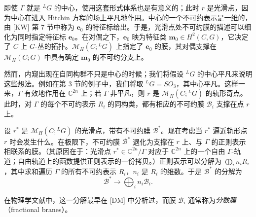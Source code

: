 \documentclass[11pt,a4paper]{article}
\newcommand{\Bun}{\mathrm{Bun}}
\begin{document}
即使 $\Gamma$ 就是 ${}^{L}G$ 的中心，使用这套形式体系也是有意义的；此时 $r$ 是光滑点，因为中心在进入 Hitchin 方程的场上平凡地作用。中心的一个不可约表示是一维的，由 [KW] 第 7 节中称为 $\boldsymbol{e}_0$ 的特征标给出。于是，光滑点处不可约膜的描述可以细化为同时指定特征标 $\boldsymbol{e}_0$。在对偶之下，$\boldsymbol{e}_0$ 映为特征类 $\boldsymbol{m}_0\in H^2(C,G)$，它决定了 $C$ 上 $G$-丛的拓扑。$\mathcal{M}_H(C;{}^{L}G)$ 上指定了 $\boldsymbol{e}_0$ 的膜，其对偶支撑在 $\mathcal{M}_H(C;G)$ 中具有确定 $\boldsymbol{m}_0$ 的不可约分支上。

然而，内窥出现在自同构群不只是中心的时候；我们将假设 ${}^{L}G$ 的中心平凡来说明这些想法。例如在第 3 节的例子中，我们将取 ${}^{L}G=SO_3$，其中心平凡。这样一来，$\Gamma$ 有效地作用在 $\mathbb{C}^{2n}$ 上；若 $\Gamma$ 非平凡，则 $r$ 是 $\mathcal{M}_H(C;{}^{L}G)$ 的轨形奇点。此时，对 $\Gamma$ 的每个不可约表示 $R_i$ 的同构类，都有相应的不可约膜 $\mathcal{B}_i$ 支撑在点 $r$ 上。

设 $r^*$ 是 $\mathcal{M}_H(C;{}^{L}G)$ 的光滑点，带有不可约膜 $\mathcal{B}^*$。现在考虑当 $r^*$ 逼近轨形点 $r$ 时会发生什么。在极限下，不可约膜 $\mathcal{B}^*$ 退化为支撑在 $r$ 上、与 $\Gamma$ 的正则表示相联系的膜。（其原因在于：光滑点 $r^*\in\mathbb{C}^{2n}/\Gamma$ 对应于 $\mathbb{C}^{2n}$ 上的一个自由 $\Gamma$-轨道；自由轨道上的函数提供正则表示的一份拷贝。）正则表示可以分解为 $\bigoplus_i n_iR_i$，其中求和遍历 $\Gamma$ 的所有不可约表示 $R_i$，$n_i$ 是 $R_i$ 的维数。于是 $\mathcal{B}^*$ 的分解为
\begin{equation}\tag{2.3}
\mathcal{B}^*\to\bigoplus_i n_i\mathcal{B}_i.
\end{equation}


在物理学文献中，这一分解最早在 [DM] 中分析过，而膜 $\mathcal{B}_i$ 通常称为\emph{分数膜}（fractional branes）。
\end{document}
